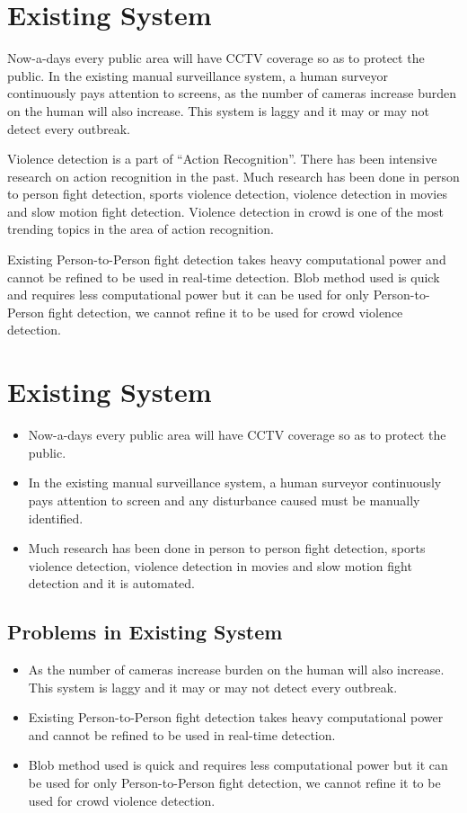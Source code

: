 \section{Existing System}
Now-a-days every public area will have CCTV coverage so as to protect the public. In the existing manual surveillance system, a human surveyor continuously pays attention to screens, as the number of cameras increase burden on the human will also increase. This system is laggy and it may or may not detect every  outbreak. 
\par
Violence detection is a part of “Action Recognition”. There has been intensive research on action recognition in the past. Much research has been done in person to person fight detection, sports violence detection, violence detection in movies and slow motion fight detection. Violence detection in crowd is one of the most trending topics in the area of action recognition. 
\par
Existing Person-to-Person fight detection takes heavy computational power and cannot be refined to be used in real-time detection. Blob method used is quick and requires less computational power but it can be used for only Person-to-Person fight detection, we cannot refine it to be used for crowd violence detection.
\section{Existing System}
\begin{itemize}
  \item Now-a-days every public area will have CCTV coverage so as to protect the public.
  \item In the existing manual surveillance system, a human surveyor continuously pays attention to screen and any disturbance caused must be manually identified.
  \item Much research has been done in person to person fight detection, sports violence detection, violence detection in movies and slow motion fight detection and it is automated.
\end{itemize}
\subsection{Problems in Existing System}
\begin{itemize}
	\item As the number of cameras increase burden on the human will also increase. This system is laggy and it may or may not detect every  outbreak.
	\item Existing Person-to-Person fight detection takes heavy computational power and cannot be refined to be used in real-time detection.
	\item Blob method used is quick and requires less computational power but it can be used for only Person-to-Person fight detection, we cannot refine it to be used for crowd violence detection.
\end{itemize}
